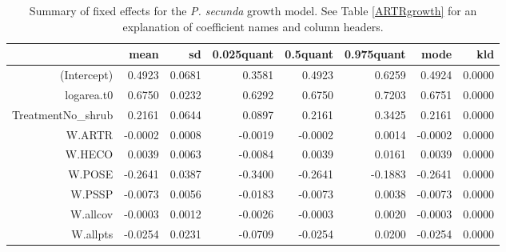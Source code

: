 \documentclass[11pt]{article}
\begin{document}
\begin{table}[ht]
\centering
\caption{Summary of fixed effects for the \textit{P. secunda} growth model. See Table \ref{ARTRgrowth} for an explanation of coefficient names
and column headers.} 
\label{POSEgrowth}
\begin{tabular}{rrrrrrrr}
  \hline
 & mean & sd & 0.025quant & 0.5quant & 0.975quant & mode & kld \\ 
  \hline
(Intercept) & 0.4923 & 0.0681 & 0.3581 & 0.4923 & 0.6259 & 0.4924 & 0.0000 \\ 
  logarea.t0 & 0.6750 & 0.0232 & 0.6292 & 0.6750 & 0.7203 & 0.6751 & 0.0000 \\ 
  TreatmentNo\_shrub & 0.2161 & 0.0644 & 0.0897 & 0.2161 & 0.3425 & 0.2161 & 0.0000 \\ 
  W.ARTR & -0.0002 & 0.0008 & -0.0019 & -0.0002 & 0.0014 & -0.0002 & 0.0000 \\ 
  W.HECO & 0.0039 & 0.0063 & -0.0084 & 0.0039 & 0.0161 & 0.0039 & 0.0000 \\ 
  W.POSE & -0.2641 & 0.0387 & -0.3400 & -0.2641 & -0.1883 & -0.2641 & 0.0000 \\ 
  W.PSSP & -0.0073 & 0.0056 & -0.0183 & -0.0073 & 0.0038 & -0.0073 & 0.0000 \\ 
  W.allcov & -0.0003 & 0.0012 & -0.0026 & -0.0003 & 0.0020 & -0.0003 & 0.0000 \\ 
  W.allpts & -0.0254 & 0.0231 & -0.0709 & -0.0254 & 0.0200 & -0.0254 & 0.0000 \\ 
   \hline
\end{tabular}
\end{table}
\end{document}

